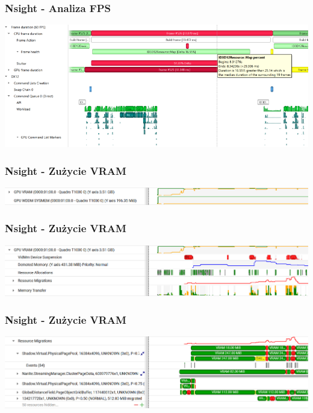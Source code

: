 \documentclass{beamer}
\begin{document}
            \begin{frame}
              \frametitle{Nsight - Analiza FPS}
              \center
                \includegraphics[width=1\textwidth]{dx12_frame_health.png}
                \end{frame}
        
        \begin{frame}
          \frametitle{Nsight - Zużycie VRAM}
          \center
            \includegraphics[width=1\textwidth]{memory_utilization.png}
            \end{frame}

            \begin{frame}
              \frametitle{Nsight - Zużycie VRAM}
              \center
                \includegraphics[width=1\textwidth]{memory_utilization_gpu_vram.png}
                \end{frame}

      \begin{frame}
        \frametitle{Nsight - Zużycie VRAM}
        \center
          \includegraphics[width=1\textwidth]{memory_utilization_resource_migrations.png}
          \end{frame}
\end{document}

